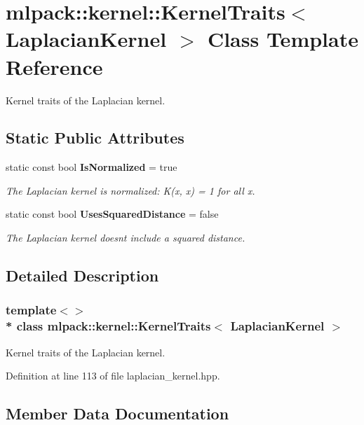 \section{mlpack\+:\+:kernel\+:\+:Kernel\+Traits$<$ Laplacian\+Kernel $>$ Class Template Reference}
\label{classmlpack_1_1kernel_1_1KernelTraits_3_01LaplacianKernel_01_4}


Kernel traits of the Laplacian kernel.  


\subsection*{Static Public Attributes}
\begin{DoxyCompactItemize}
\item 
static const bool {\bf Is\+Normalized} = true
\begin{DoxyCompactList}\small\item\em The Laplacian kernel is normalized\+: K(x, x) = 1 for all x. \end{DoxyCompactList}\item 
static const bool {\bf Uses\+Squared\+Distance} = false
\begin{DoxyCompactList}\small\item\em The Laplacian kernel doesn\textquotesingle{}t include a squared distance. \end{DoxyCompactList}\end{DoxyCompactItemize}


\subsection{Detailed Description}
\subsubsection*{template$<$$>$\\*
class mlpack\+::kernel\+::\+Kernel\+Traits$<$ Laplacian\+Kernel $>$}

Kernel traits of the Laplacian kernel. 

Definition at line 113 of file laplacian\+\_\+kernel.\+hpp.



\subsection{Member Data Documentation}
